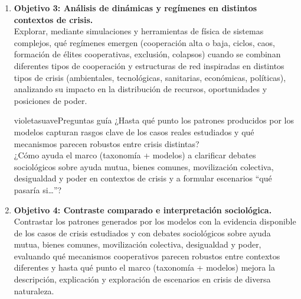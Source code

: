 \documentclass[a4paper,11pt]{article}
\begin{document}
\begin{seccionbox}[verdesuave]
\begin{enumerate}
    \item \textbf{Objetivo 3: Análisis de dinámicas y regímenes en distintos contextos de crisis.}\\[0.2cm]
    Explorar, mediante simulaciones y herramientas de física de sistemas complejos, qué regímenes emergen (cooperación alta o baja, ciclos, caos, formación de élites cooperativas, exclusión, colapsos) cuando se combinan diferentes tipos de cooperación y estructuras de red inspiradas en distintos tipos de crisis (ambientales, tecnológicas, sanitarias, económicas, políticas), analizando su impacto en la distribución de recursos, oportunidades y posiciones de poder.

\tcbline

    \begin{caja}{violetasuave}{Preguntas guía}{}
        ¿Hasta qué punto los patrones producidos por los modelos capturan rasgos clave de los casos reales estudiados y qué mecanismos parecen robustos entre crisis distintas?\\[0.2cm]
        ¿Cómo ayuda el marco (taxonomía + modelos) a clarificar debates sociológicos sobre ayuda mutua, bienes comunes, movilización colectiva, desigualdad y poder en contextos de crisis y a formular escenarios “qué pasaría si…”?
    \end{caja}

    \item \textbf{Objetivo 4: Contraste comparado e interpretación sociológica.}\\[0.2cm]
    Contrastar los patrones generados por los modelos con la evidencia disponible de los casos de crisis estudiados y con debates sociológicos sobre ayuda mutua, bienes comunes, movilización colectiva, desigualdad y poder, evaluando qué mecanismos cooperativos parecen robustos entre contextos diferentes y hasta qué punto el marco (taxonomía + modelos) mejora la descripción, explicación y exploración de escenarios en crisis de diversa naturaleza.

\end{enumerate}

\end{seccionbox}

\newpage
\end{document}
